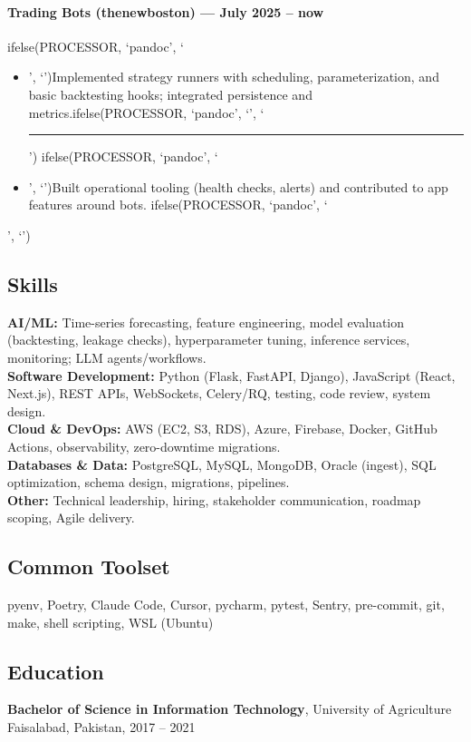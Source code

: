 \documentclass[a4paper,11pt]{article}
\newcommand{\chrule}{ifelse(PROCESSOR, `pandoc', `', `\vspace{3pt}\hrule')}
\newcommand{\pdbeginitemize}{ifelse(PROCESSOR, `pandoc', `\begin{itemize}', `')}
\newcommand{\pditem}{ifelse(PROCESSOR, `pandoc', `\item', `')}
\newcommand{\pdenditemize}{ifelse(PROCESSOR, `pandoc', `\end{itemize}', `')}
\begin{document}
\paragraph*{Trading Bots (thenewboston) — July 2025 -- now}
\pdbeginitemize
\pditem Implemented strategy runners with scheduling, parameterization, and basic backtesting hooks; integrated persistence and metrics.\chrule
\pditem Built operational tooling (health checks, alerts) and contributed to app features around bots.
\pdenditemize


\subsection*{Skills}
\textbf{AI/ML:} Time-series forecasting, feature engineering, model evaluation (backtesting, leakage checks), hyperparameter tuning, inference services, monitoring; LLM agents/workflows.\\
\textbf{Software Development:} Python (Flask, FastAPI, Django), JavaScript (React, Next.js), REST APIs, WebSockets, Celery/RQ, testing, code review, system design.\\
\textbf{Cloud \& DevOps:} AWS (EC2, S3, RDS), Azure, Firebase, Docker, GitHub Actions, observability, zero-downtime migrations.\\
\textbf{Databases \& Data:} PostgreSQL, MySQL, MongoDB, Oracle (ingest), SQL optimization, schema design, migrations, pipelines.\\
\textbf{Other:} Technical leadership, hiring, stakeholder communication, roadmap scoping, Agile delivery.



\subsection*{\hypertarget{common-toolset}{Common Toolset}}
pyenv, Poetry, Claude Code, Cursor, pycharm, pytest, Sentry, pre-commit, git, make, shell scripting, WSL (Ubuntu)


\subsection*{Education}
\textbf{Bachelor of Science in Information Technology}, University of Agriculture Faisalabad, Pakistan, 2017 -- 2021


\end{document}
